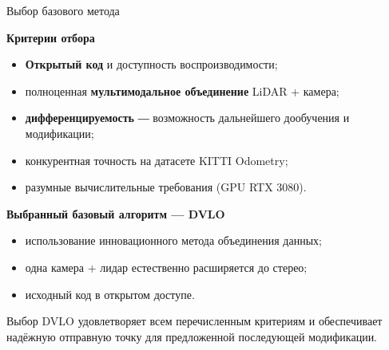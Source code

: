 \documentclass{beamer} %
\begin{document}
\begin{frame}{Выбор базового метода}
  \footnotesize{

  \textbf{Критерии отбора}
  \begin{itemize}
      \item \textbf{Открытый код} и доступность воспроизводимости;
      \item полноценная \textbf{мультимодальное объединение} LiDAR + камера;
      \item \textbf{дифференцируемость} ― возможность дальнейшего дообучения и модификации;
      \item конкурентная точность на датасете KITTI Odometry;
      \item разумные вычислительные требования (GPU  RTX 3080).
  \end{itemize}

  \vspace{0.6cm}

  \textbf{Выбранный базовый алгоритм — DVLO}  
  \begin{itemize}
      \item использование инновационного метода объединения данных;
      \item одна камера + лидар естественно расширяется до стерео;
      \item исходный код в открытом доступе.
  \end{itemize}

  \vspace{0.3cm}
  Выбор DVLO удовлетворяет всем перечисленным критериям  
  и обеспечивает надёжную отправную точку для предложенной последующей модификации.
  }
\end{frame}
\end{document}
